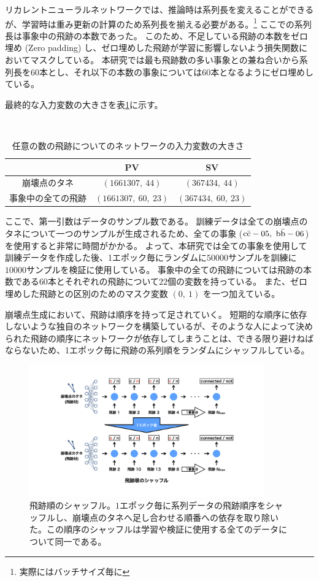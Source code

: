 リカレントニューラルネットワークでは、推論時は系列長を変えることができるが、学習時は重み更新の計算のため系列長を揃える必要がある。\footnote{実際にはバッチサイズ毎に}
ここでの系列長は事象中の飛跡の本数であった。
このため、不足している飛跡の本数をゼロ埋め (Zero padding) し、ゼロ埋めした飛跡が学習に影響しないよう損失関数においてマスクしている。
本研究では最も飛跡数の多い事象との兼ね合いから系列長を$60$本とし、それ以下の本数の事象については$60$本となるようにゼロ埋めしている。

最終的な入力変数の大きさを表\ref{VLSTMInputParameterShape}に示す。

\begin{table}[htb]
 \centering
　\small
  \begin{tabular}{c | c c}\hline
    & PV & SV\\\hline
    崩壊点のタネ & $(1661307,\ 44)$ & $(367434,\ 44)$\\
    事象中の全ての飛跡 & $(1661307,\ 60,\ 23)$ & $(367434,\ 60,\ 23)$\\\hline
  \end{tabular}
  \caption{任意の数の飛跡についてのネットワークの入力変数の大きさ}
  \label{VLSTMInputParameterShape}
\end{table}

ここで、第一引数はデータのサンプル数である。
訓練データは全ての崩壊点のタネについて一つのサンプルが生成されるため、全ての事象 ($\rm c\bar{c}-05,\ \rm b\bar{b}-06$) を使用すると非常に時間がかかる。
よって、本研究では全ての事象を使用して訓練データを作成した後、1エポック毎にランダムに$50000$サンプルを訓練に$10000$サンプルを検証に使用している。
事象中の全ての飛跡については飛跡の本数である$60$本とそれぞれの飛跡について$22$個の変数を持っている。
また、ゼロ埋めした飛跡との区別のためのマスク変数 $(0,\ 1)$ を一つ加えている。

崩壊点生成において、飛跡は順序を持って足されていく。
短期的な順序に依存しないような独自のネットワークを構築しているが、そのような人によって決められた飛跡の順序にネットワークが依存してしまうことは、できる限り避けねばならないため、1エポック毎に飛跡の系列順をランダムにシャッフルしている。

\begin{figure}[htbp]
 \centering
 \includegraphics[trim = 150 100 150 100, width=0.9\textwidth, clip]{Figure/3Networks/3-4-2-1TrackShuffle.png}
 \caption[飛跡順のシャッフル]{飛跡順のシャッフル。$1$エポック毎に系列データの飛跡順序をシャッフルし、崩壊点のタネへ足し合わせる順番への依存を取り除いた。この順序のシャッフルは学習や検証に使用する全てのデータについて同一である。}
 \label{3-4-2-1TrackShuffle}
\end{figure}

